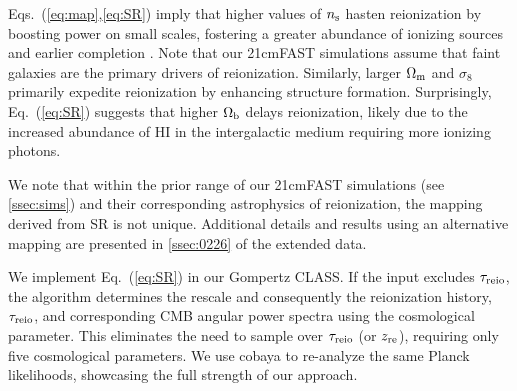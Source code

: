 Eqs.~(\ref{eq:map},\ref{eq:SR}) imply that higher values of $n_\mathrm{s}$ hasten
reionization by boosting power on small scales, fostering a greater
abundance of ionizing sources and earlier completion \cite{Montero2021}.
Note that our 21cmFAST simulations assume that faint galaxies are the
primary drivers of reionization.
Similarly, larger $\Omega_\mathrm{m}$ and $\sigma_8$ primarily expedite
reionization by enhancing structure formation.
Surprisingly, Eq.~(\ref{eq:SR}) suggests that higher $\Omega_\mathrm{b}$ delays
reionization, likely due to the increased abundance of HI in the
intergalactic medium requiring more ionizing photons.

We note that within the prior range of our 21cmFAST simulations (see
\ref{ssec:sims}) and their corresponding astrophysics of reionization,
the mapping derived from SR is not unique.
Additional details and results using an alternative mapping are
presented in \ref{ssec:0226} of the extended data.

We implement Eq.~(\ref{eq:SR}) in our Gompertz CLASS.
If the input excludes $\tau_{\mathrm{reio}}$, the algorithm determines the rescale
and consequently the reionization history, $\tau_{\mathrm{reio}}$, and
corresponding CMB angular power spectra using the cosmological
parameter.
This eliminates the need to sample over $\tau_{\mathrm{reio}}$ (or $z_{\mathrm{re}}$),
requiring only five cosmological parameters.
We use cobaya to re-analyze the same Planck likelihoods, showcasing the
full strength of our approach.

